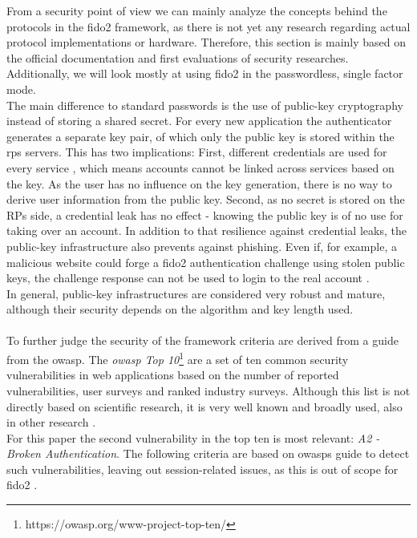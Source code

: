 From a security point of view we can mainly analyze the concepts behind the protocols in the \ac{fido2} framework, as there is not yet any research regarding actual protocol implementations or hardware. Therefore, this section is mainly based on the official documentation and first evaluations of security researches. Additionally, we will look mostly at using \ac{fido2} in the passwordless, single factor mode.\\
The main difference to standard passwords is the use of public-key cryptography instead of storing a shared secret. For every new application the authenticator generates a separate key pair, of which only the public key is stored within the \acp{rp} servers. This has two implications: First, different credentials are used for every service \cite{mdn_webauthn,webauthn_standard}, which means accounts cannot be linked across services based on the key. As the user has no influence on the key generation, there is no way to derive user information from the public key. Second, as no secret is stored on the RPs side, a credential leak has no effect - knowing the public key is of no use for taking over an account. In addition to that resilience against credential leaks, the public-key infrastructure also prevents against phishing. Even if, for example, a malicious website could forge a \ac{fido2} authentication challenge using stolen public keys, the challenge response can not be used to login to the real account \cite{fido2_webauthn,fido2_overview}.\\
In general, public-key infrastructures are considered very robust and mature, although their security depends on the algorithm and key length used.\\
\\
To further judge the security of the framework criteria are derived from a guide from the \ac{owasp}. The \emph{\ac{owasp} Top 10}\footnote{https://owasp.org/www-project-top-ten/} are a set of ten common security vulnerabilities in web applications based on the number of reported vulnerabilities, user surveys and ranked industry surveys. Although this list is not directly based on scientific research, it is very well known and broadly used, also in other research \cite{rafique2015}.\\
For this paper the second vulnerability in the top ten is most relevant: \emph{A2 - Broken Authentication}. The following criteria are based on \acp{owasp} guide to detect such vulnerabilities, leaving out session-related issues, as this is out of scope for \ac{fido2} \cite{owasp_auth}.

